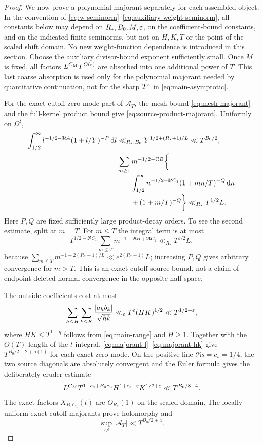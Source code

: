 \begin{proof}
We now prove a polynomial majorant separately for each assembled object.
In the convention of
\eqref{eq:w-seminorm}--\eqref{eq:auxiliary-weight-seminorm}, all constants
below may depend on
$R_*,B_0,M,\varepsilon$, on the coefficient-bound constants, and on the indicated
finite seminorms, but not on $H,K,T$ or the point of the scaled shift domain.
No new weight-function dependence is introduced in this section.  Choose the
auxiliary divisor-bound exponent sufficiently small.  Once $M$ is fixed, all
factors $L^{C_M}T^{O(\varepsilon)}$ are absorbed into one additional power of $T$.
This last coarse absorption is used only for the polynomial majorant needed
by quantitative continuation, not for the sharp $T^\varepsilon$ in
\eqref{eq:main-asymptotic}.

For the exact-cutoff zero-mode part of $\mathscr A_T$, the mesh bound
\eqref{eq:mesh-majorant} and the full-kernel product bound give
\eqref{eq:source-product-majorant}.  Uniformly on $\Omega^\sharp$,
\begin{align}
 \int_{1/2}^{\infty}l^{-1/2-\Re A}(1+l/Y)^{-P}\,\mathrm d l
 &\ll_{R_*,B_0}Y^{1/2+(R_*+1)/L}\ll T^{B_0/2},
 \label{eq:majorant-l}\\
 &\sum_{m\geq1}m^{-1/2-\Re B}\bigg\{\notag\\[-2pt]
 &\qquad\int_{1/2}^{\infty}n^{-1/2-\Re C_1}
       (1+mn/T)^{-Q}\,\mathrm d n\notag\\[-2pt]
 &\qquad{}+(1+m/T)^{-Q}\bigg\}
 \ll_{R_*}T^{1/2}L.
 \label{eq:majorant-mn}
\end{align}
Here $P,Q$ are fixed sufficiently large product-decay orders.  To see the
second estimate, split at $m=T$.  For $m\leq T$ the integral term is at most
\[
 T^{1/2-\Re C_1}
 \sum_{m\leq T}m^{-1-\Re B+\Re C_1}
 \ll_{R_*}T^{1/2}L,
\]
because
$\sum_{m\leq T}m^{-1+2(R_*+1)/L}\ll e^{2(R_*+1)}L$; increasing $P,Q$
gives arbitrary convergence for $m>T$.  This is an exact-cutoff source
bound, not a claim of endpoint-deleted normal convergence in the opposite
half-space.

The outside coefficients cost at most
\begin{equation}\label{eq:majorant-hk}
 \sum_{h\leq H}\sum_{k\leq K}\frac{|a_hb_k|}{\sqrt{hk}}
 \ll_\varepsilon T^\varepsilon(HK)^{1/2}\ll T^{1/2+\varepsilon},
\end{equation}
where $HK\leq T^{1-\eta}$ follows from \eqref{eq:main-range} and $H\geq1$.
Together with the $O(T)$ length of the $t$-integral,
\eqref{eq:majorant-l}--\eqref{eq:majorant-hk} give
$T^{B_0/2+2+o(1)}$ for each exact zero mode.  On the positive line
$\Re s=c_s=1/4$, the two source diagonals are absolutely convergent and the
Euler formula gives the deliberately cruder estimate
\begin{equation}\label{eq:majorant-source-diagonal}
 L^{C_M}T^{1+c_s+B_0c_u}
 H^{1+c_s+\varepsilon}K^{1/2+\varepsilon}\ll T^{B_0/8+4}.
\end{equation}
The exact factors $X_{B,C_1}(t)$ are $O_{R_*}(1)$ on the scaled domain.
The locally uniform exact-cutoff majorants prove holomorphy and
\begin{equation}\label{eq:A-T-polynomial}
                  \sup_{\Omega^\sharp}|\mathscr A_T|
                  \ll T^{B_0/2+4}.
\end{equation}


\end{proof}
